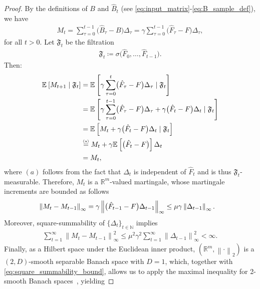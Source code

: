 \documentclass[10pt,leqno]{amsart}
\newcommand{\stkrl}[2]{\stackrel{\text{\tiny{(#1)}}}{#2}}
\newcommand{\norm}[1]{\left \|#1 \right \|}
\newcommand{\R}{\mathbb{R}}
\newcommand{\N}{\mathbb{N}}
\newcommand{\F}{F}
\newcommand{\Fapx}{\hat{F}}
\newcommand{\disc}{\gamma}
\newcommand{\B}{B}
\newcommand{\twonorm}[1]{\norm{#1}_2}
\newcommand{\infnorm}[1]{\norm{#1}_\infty}
\newcommand{\E}[2]{\mathbb{E}_{#1}\left[#2\right]}
\newcommand{\Bapx}{\hat{B}}
\begin{document}
\begin{proof}
    By the definitions of $\B$ and $\Bapx_t$ (see \eqref{eq:input_matrix}-\eqref{eq:B_sample_def}), we have
    \begin{align}\label{eq:equivalent_def_martingale}
        M_t = \sum_{\tau = 0}^{t-1} \bigl(\Bapx_\tau - \B\bigr)\Delta_\tau = \disc \sum_{\tau = 0}^{t-1} \bigl(\Fapx_\tau - \F\bigr)\Delta_\tau,
    \end{align}
    for all $t > 0$. Let $\mathfrak{F}_t$ be the filtration
    \begin{align}\label{eq:azuma_hoeffding}
        \mathfrak{F}_t \coloneqq \sigma\bigl(\Fapx_0, \hdots, \Fapx_{t-1}\bigr).
    \end{align}
    Then:
    \begin{align*}
        \E{}{M_{t+1} \mid \mathfrak{F}_t} &= \E{}{ \disc\sum_{\tau = 0}^t \bigl(\Fapx_\tau - \F\bigr) \Delta_\tau \mid \mathfrak{F}_t}\\
        &= \E{}{ \disc \sum_{\tau = 0}^{t-1} \bigl(\Fapx_\tau - \F\bigr) \Delta_\tau + \disc\bigl(\Fapx_t - \F\bigr) \Delta_t \mid \mathfrak{F}_t}\\
        &= \E{}{M_t +  \disc\bigl(\Fapx_t - \F\bigr) \Delta_t \mid \mathfrak{F}_t}\\
        &\stkrl{a}{=} M_t +  \disc\E{}{\bigl(\Fapx_t - \F\bigr)} \Delta_t\\
        &= M_t,
    \end{align*}
    where $(a)$ follows from the fact that $\Delta_t$ is independent of $\Fapx_t$ and is thus $\mathfrak{F}_t$-measurable. Therefore, $M_t$ is a $\R^m$-valued martingale, whose martingale increments are bounded as follows
    \begin{align}
        \hspace{-0.3cm}\infnorm{M_t - M_{t-1}} = \disc \infnorm{\bigl(\Fapx_{t - 1} - \F\bigr) \Delta_{t - 1}} \leq \mu \disc \infnorm{\Delta_{t - 1}}\label{eq:increment_bound}.
    \end{align}
    Moreover, square-summability of $\{\Delta_t\}_{t \in \N}$ implies
    \begin{align}\label{eq:square_summability_bound}
        \sum_{t = 1}^\infty \infnorm{M_t - M_{t-1}}^2 \leq \mu^2 \disc^2 \sum_{t = 1}^\infty \infnorm{\Delta_{t-1}}^2 < \infty.
    \end{align}
    Finally, as a Hilbert space under the Euclidean inner product, $(\R^m, \twonorm{\cdot})$ is a $(2, D)$-smooth separable Banach space with $D = 1$, which, together with \eqref{eq:square_summability_bound}, allows us to apply the maximal inequality for 2-smooth Banach spaces~\cite[Theorem 3.5]{pinelis1994optimum}, yielding

\end{proof}
\end{document}
